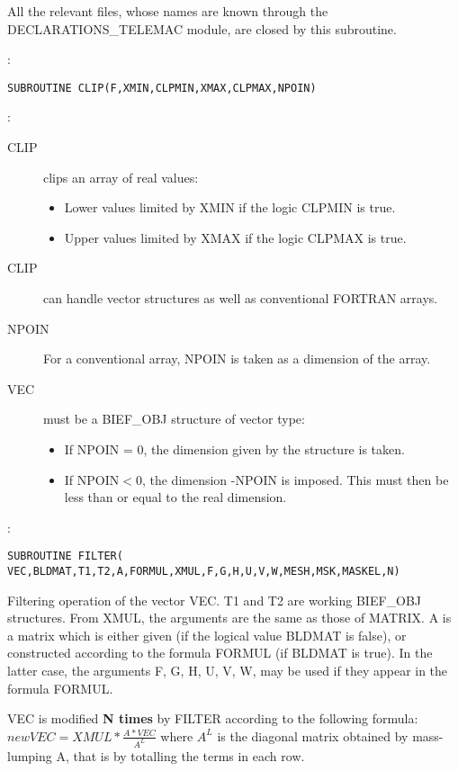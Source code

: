 All the relevant files, whose names are known through the DECLARATIONS\_TELEMAC
module, are closed by this subroutine.

:
\begin{lstlisting}[language=TelFortran]
SUBROUTINE CLIP(F,XMIN,CLPMIN,XMAX,CLPMAX,NPOIN)
\end{lstlisting}

:
\begin{description}
  \item [CLIP] clips an array of real values:
    \begin{itemize}
      \item Lower values limited by XMIN if the logic CLPMIN is true.
      \item Upper values limited by XMAX if the logic CLPMAX is true.
    \end{itemize}
  \item [CLIP] can handle vector structures as well as conventional FORTRAN
    arrays.
  \item [NPOIN] For a conventional array, NPOIN is taken as a dimension of the
    array.
  \item [VEC] must be a BIEF\_OBJ structure of vector type:
    \begin{itemize}
      \item If NPOIN = 0, the dimension given by the structure is taken.
      \item If NPOIN$<$0, the dimension -NPOIN is imposed. This must then be
        less than or equal to the real dimension.
    \end{itemize}
\end{description}

:
\begin{lstlisting}[language=TelFortran]
SUBROUTINE FILTER( VEC,BLDMAT,T1,T2,A,FORMUL,XMUL,F,G,H,U,V,W,MESH,MSK,MASKEL,N)
\end{lstlisting}

Filtering operation of the vector VEC. T1 and T2 are working BIEF\_OBJ
structures. From XMUL, the arguments are the same as those of MATRIX. A is a
matrix which is either given (if the logical value BLDMAT is false), or
constructed according to the formula FORMUL (if BLDMAT is true). In the latter
case, the arguments F, G, H, U, V, W, may be used if they appear in the formula
FORMUL.

VEC is modified \textbf{N times} by FILTER according to the following formula:
$new VEC = XMUL*\frac{A*VEC}{A^{L}}$
where $A^{L}$ is the diagonal matrix obtained by mass-lumping A, that is by
totalling the terms in each row.

